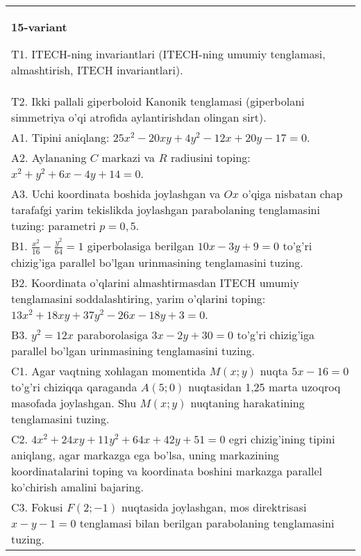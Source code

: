 \documentclass{article}
\begin{document}
\begin{tabular}{m{17cm}}
\textbf{15-variant}
\newline

T1. ITECH-ning invariantlari (ITECH-ning umumiy tenglamasi, almashtirish, ITECH invariantlari).\\

T2. Ikki pallali giperboloid Kanonik tenglamasi (giperbolani simmetriya o'qi atrofida aylantirishdan olingan sirt).\\

A1. Tipini aniqlang: $25x^{2}-20xy+4y^{2}-12x+20y-17=0$.\\

A2. Aylananing $C$ markazi va $R$ radiusini toping: $x^2+y^2+6x-4y+14=0$.\\

A3. Uchi koordinata boshida joylashgan va $Ox$ o'qiga nisbatan chap tarafafgi yarim tekislikda joylashgan parabolaning tenglamasini tuzing: parametri $p=0,5$.\\

B1. $\frac{x^{2}}{16} - \frac{y^{2}}{64} = 1$ giperbolasiga berilgan $10x - 3y + 9 = 0$ to'g'ri chizig'iga parallel bo'lgan urinmasining tenglamasini tuzing.  \\

B2. Koordinata o'qlarini almashtirmasdan ITECH umumiy tenglamasini soddalashtiring, yarim o'qlarini toping: $13x^{2} + 18xy + 37y^{2} - 26x - 18y + 3 = 0$.  \\

B3. $y^{2} = 12x$ paraborolasiga $3x - 2y + 30 = 0$ to'g'ri chizig'iga parallel bo'lgan urinmasining tenglamasini tuzing.  \\

C1. Agar vaqtning xohlagan momentida $M(x;y)$ nuqta $5x - 16 = 0$ to'g'ri chiziqqa qaraganda $A(5;0)$ nuqtasidan 1,25 marta uzoqroq masofada joylashgan. Shu $M(x;y)$ nuqtaning harakatining tenglamasini tuzing.  \\

C2. $4x^{2} + 24xy + 11y^{2} + 64x + 42y + 51 = 0$ egri chizig'ining tipini aniqlang, agar markazga ega bo'lsa, uning markazining koordinatalarini toping va koordinata boshini markazga parallel ko'chirish amalini bajaring.\\

C3. Fokusi $F(2; - 1)$ nuqtasida joylashgan, mos direktrisasi $x - y - 1 = 0$ tenglamasi bilan berilgan parabolaning tenglamasini tuzing.  \\

\end{tabular}
\vspace{1cm}
\end{document}
